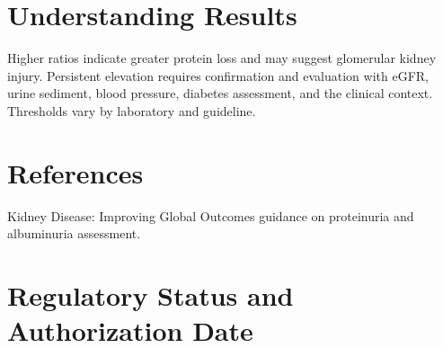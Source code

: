 \section*{Understanding Results}
Higher ratios indicate greater protein loss and may suggest glomerular kidney injury. Persistent elevation requires confirmation and evaluation with eGFR, urine sediment, blood pressure, diabetes assessment, and the clinical context. Thresholds vary by laboratory and guideline.

\section*{References}
Kidney Disease: Improving Global Outcomes guidance on proteinuria and albuminuria assessment.

\clearpage


\section*{Regulatory Status and Authorization Date}

\clearpage

